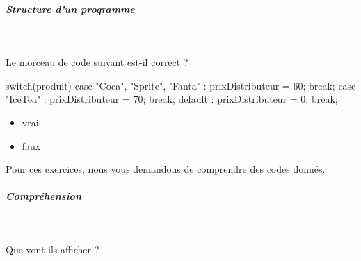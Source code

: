 \documentclass[11pt,a4paper]{article}
\begin{document}
		\subparagraph{Structure d'un programme} 
		
                \textcolor{white}{.} \par
            Le morceau de code suivant est-il correct ?
					  \begin{Java}
switch(produit) {
      case "Coca", "Sprite", "Fanta" :
          prixDistributeur = 60;
          break;
      case "IceTea" :
          prixDistributeur = 70;
          break;
      default :
          prixDistributeur = 0;
          break;
}\end{Java}
            \begin{itemize} 
        
            \item[ \ding{"6D} ]  
							vrai
            
        
            \item[ \ding{"6D} ]  
							faux
            
        
            \end{itemize} 
        
          Pour ces exercices, nous vous demandons de comprendre des codes donn\'es. 
        
            \par
        
			
		\subparagraph{Compr\'ehension} 
		
                \textcolor{white}{.} \par
            
							  Que vont-ils afficher ?
              
\end{document}
